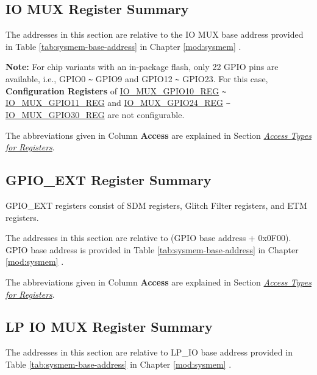 \documentclass[main\_\_EN.tex]{subfiles}
\begin{document}
\label{section:4.12}




\subsection{IO MUX Register Summary}
The addresses in this section are relative to the IO MUX base address provided in Table \ref{tab:sysmem-base-address} in Chapter \ref{mod:sysmem} \textit{}.

\textbf{Note:} For chip variants with an in-package flash, only 22 GPIO pins are available, i.e., GPIO0 \verb+~+ GPIO9 and GPIO12 \verb+~+ GPIO23. For this case, \textbf{Configuration Registers} of \hyperref[regdesc:IOMUXGPIONREG]{IO\_MUX\_GPIO10\_REG} \verb+~+ \hyperref[regdesc:IOMUXGPIONREG]{IO\_MUX\_GPIO11\_REG} and \hyperref[regdesc:IOMUXGPIONREG]{IO\_MUX\_GPIO24\_REG} \verb+~+ \hyperref[regdesc:IOMUXGPIONREG]{IO\_MUX\_GPIO30\_REG} are not configurable.

The abbreviations given in Column \textbf{Access} are explained in Section \hyperref[glossary-access-types]{\textit{Access Types for Registers}}.




\subsection{GPIO\_EXT Register Summary}

GPIO\_EXT registers consist of SDM registers, Glitch Filter registers, and ETM registers.

The addresses in this section are relative to (GPIO base address + 0x0F00). GPIO base address is provided in Table \ref{tab:sysmem-base-address} in Chapter \ref{mod:sysmem} \textit{}.

The abbreviations given in Column \textbf{Access} are explained in Section \hyperref[glossary-access-types]{\textit{Access Types for Registers}}.



\subsection{LP IO MUX Register Summary}
The addresses in this section are relative to LP\_IO base address provided in Table \ref{tab:sysmem-base-address} in Chapter \ref{mod:sysmem} \textit{}.
\end{document}
